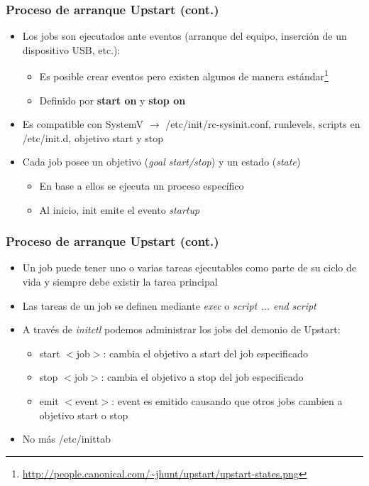 \begin{frame}
  \frametitle{Proceso de arranque \textbf{Upstart} (cont.)}
  \begin{itemize}
	  	\item Los jobs son ejecutados ante eventos (arranque del equipo, inserción de un dispositivo USB, etc.):
	  	\begin{itemize}
	  		\item Es posible crear eventos pero existen algunos de manera estándar\footnote{\url{http://people.canonical.com/~jhunt/upstart/upstart-states.png}}
	  		\item Definido por \textbf{start on} y \textbf{stop on}
	  	\end{itemize}  
  		\item Es compatible con SystemV $\rightarrow$ /etc/init/rc-sysinit.conf, runlevels, scripts en /etc/init.d, objetivo start y stop
	  	\item Cada job posee un objetivo (\textit{goal start/stop}) y un estado (\textit{state})
	  	\begin{itemize}
	  		\item En base a ellos se ejecuta un proceso específico
	  		\item Al inicio, init emite el evento \textit{startup}
	  	\end{itemize}
  \end{itemize}
\end{frame}

\begin{frame}
  	\frametitle{Proceso de arranque \textbf{Upstart} (cont.)}
  	\begin{itemize}
		\item Un job puede tener uno o varias tareas ejecutables como parte de su ciclo de vida y siempre debe existir la tarea principal
	  	\item Las tareas de un job se definen mediante \textit{exec} o \textit{script ... end script}
	  	\item A través de \textit{initctl} podemos administrar los jobs del demonio de Upstart:
	  	\begin{itemize}
	  		\item start $<$job$>$: cambia el objetivo a start del job especificado
	  		\item stop $<$job$>$: cambia el objetivo a stop del job especificado
	  		\item emit $<$event$>$: event es emitido causando que otros jobs cambien a objetivo start o stop
	  	\end{itemize}
	  	\item No más /etc/inittab
  	\end{itemize}
\end{frame}

